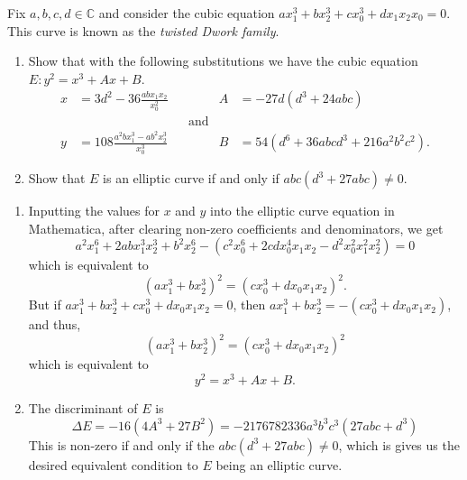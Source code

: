 \documentclass[12 pt, letterpaper]{hmcpset}
\begin{document}
\pagebreak

\begin{problem}[Problem 2.]
	Fix $a, b, c, d \in \mathbb{C}$ and consider the cubic equation $a x_{1}^{3} + b x_{2}^{3} + c x_{0}^{3} + d x_{1} x_{2} x_{0} = 0$. This curve is known as the \emph{twisted Dwork family}.
	\begin{enumerate}
		\item Show that with the following substitutions we have the cubic equation $E : y^{2} = x^{3} + A x + B$.
			\begin{align*}
				x & = 3 d^{2} - 36 \frac{a b x_{1} x_{2}}{x_{0}^{2}} & & & A & = -27 d(d^{3} + 24 a b c) \\
				  & & & \text{and} \\
				y & = 108 \frac{a^{2} b x_{1}^{3} - a b^{2} x_{2}^{3}}{x_{0}^{3}} & & & B & = 54 (d^{6} + 36 a b c d^{3} + 216 a^{2} b^{2} c^{2}).
			\end{align*}
		\item Show that $E$ is an elliptic curve if and only if $a b c(d^{3} + 27 a b c) \neq 0$.
	\end{enumerate}
\end{problem}

\begin{solution}
	\begin{enumerate}
		\item Inputting the values for $x$ and $y$ into the elliptic curve equation in Mathematica, after clearing non-zero coefficients and denominators, we get
			\[
				a^{2} x_{1}^{6} + 2 a b x_{1}^{3} x_{2}^{3} + b^{2} x_{2}^{6} - (c^{2} x_{0}^{6} + 2 c d x_{0}^{4} x_{1} x_{2} - d^{2} x_{0}^{2} x_{1}^{2} x_{2}^{2}) = 0
			\]
			which is equivalent to
			\[
				(a x_{1}^{3} + b x_{2}^{3})^{2} = (c x_{0}^{3} + d x_{0} x_{1} x_{2})^{2}.
			\]
			But if $a x_{1}^{3} + b x_{2}^{3} + cx_{0}^{3} + d x_{0} x_{1} x_{2} = 0$, then  $a x_{1}^{3} + b x_{2}^{3} = -(c x_{0}^{3} + d x_{0} x_{1} x_{2})$, and thus,
			\[
				(a x_{1}^{3} + b x_{2}^{3})^{2} = (c x_{0}^{3} + d x_{0} x_{1} x_{2})^{2}
			\]
			which is equivalent to
			\[
				y^{2} = x^{3} + A x + B.
			\]
		\item The discriminant of $E$ is
			\[
				\Delta E = -16(4 A^{3} + 27 B^{2}) = -2176782336 a^{3} b^{3} c^{3} (27 abc + d^{3})
			\]
			This is non-zero if and only if the $abc(d^{3} + 27 a b c) \neq 0$, which is gives us the desired equivalent condition to $E$ being an elliptic curve.
	\end{enumerate}
\end{solution}
\end{document}
